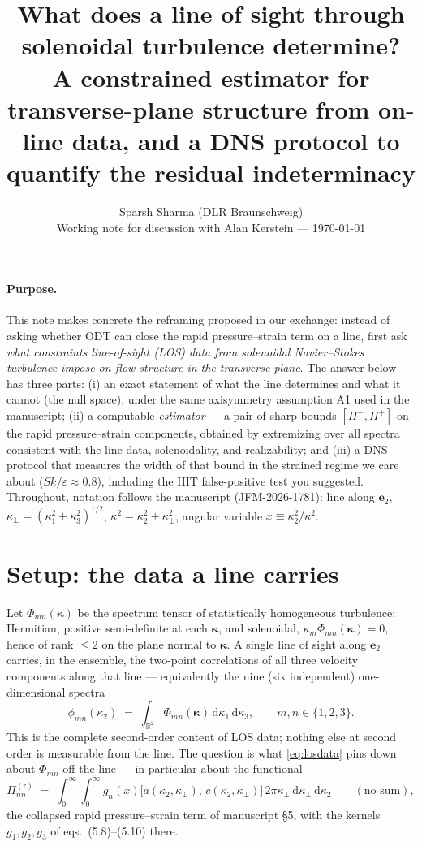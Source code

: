 \documentclass[11pt,a4paper]{article}
\title{\vspace{-1.2em}What does a line of sight through solenoidal turbulence
determine?\\[0.3em]
\large A constrained estimator for transverse-plane structure from on-line
data, and a DNS protocol to quantify the residual indeterminacy}
\author{Sparsh Sharma (DLR Braunschweig)\\[0.2em]
\normalsize Working note for discussion with Alan Kerstein --- \today}
\date{}
\newcommand{\kk}{\bm{\kappa}}
\newcommand{\kperp}{\kappa_\perp}
\newcommand{\Pir}[1]{\Pi^{(\mathrm r)}_{#1}}
\newcommand{\dd}{\mathrm{d}}
\begin{document}
\maketitle
\vspace{-2em}

\paragraph{Purpose.} This note makes concrete the reframing proposed in our
exchange: instead of asking whether ODT can close the rapid pressure--strain
term on a line, first ask \emph{what constraints line-of-sight (LOS) data from
solenoidal Navier--Stokes turbulence impose on flow structure in the
transverse plane}. The answer below has three parts: (i) an exact statement of
what the line determines and what it cannot (the null space), under the same
axisymmetry assumption A1 used in the manuscript; (ii) a computable
\emph{estimator} --- a pair of sharp bounds $[\Pi^-,\Pi^+]$ on the rapid
pressure--strain components, obtained by extremizing over all spectra
consistent with the line data, solenoidality, and realizability; and (iii) a
DNS protocol that measures the width of that bound in the strained regime we
care about ($Sk/\varepsilon\approx 0.8$), including the HIT false-positive
test you suggested. Throughout, notation follows the manuscript
(JFM-2026-1781): line along $\bm e_2$, $\kperp=(\kappa_1^2+\kappa_3^2)^{1/2}$,
$\kappa^2 = \kappa_2^2+\kperp^2$, angular variable $x\equiv\kappa_2^2/\kappa^2$.

\section{Setup: the data a line carries}\label{sec:setup}

Let $\Phi_{mn}(\kk)$ be the spectrum tensor of statistically homogeneous
turbulence: Hermitian, positive semi-definite at each $\kk$, and solenoidal,
$\kappa_m\Phi_{mn}(\kk)=0$, hence of rank $\le 2$ on the plane normal to
$\kk$. A single line of sight along $\bm e_2$ carries, in the ensemble, the
two-point correlations of all three velocity components along that line ---
equivalently the nine (six independent) one-dimensional spectra
\begin{equation}
  \phi_{mn}(\kappa_2)
  \;=\; \int_{\mathbb{R}^2}\Phi_{mn}(\kk)\,\dd\kappa_1\,\dd\kappa_3 ,
  \qquad m,n\in\{1,2,3\}.
  \label{eq:losdata}
\end{equation}
This is the complete second-order content of LOS data; nothing else at second
order is measurable from the line. The question is what
\eqref{eq:losdata} pins down about $\Phi_{mn}$ off the line --- in particular
about the functional
\begin{equation}
  \Pir{nn} \;=\; \int_0^\infty\!\!\int_0^\infty
  g_n(x)\bigl[a(\kappa_2,\kperp),\,c(\kappa_2,\kperp)\bigr]\,
  2\pi\kperp\,\dd\kperp\,\dd\kappa_2
  \qquad(\text{no sum}),
  \label{eq:target}
\end{equation}
the collapsed rapid pressure--strain term of manuscript \S5, with the kernels
$g_1,g_2,g_3$ of eqs.~(5.8)--(5.10) there.
\end{document}
